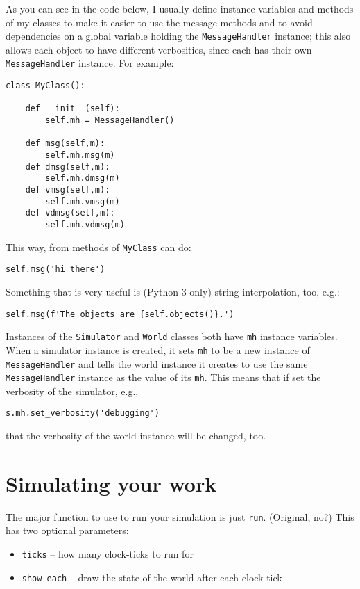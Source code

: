 \documentclass[11pt]{tufte-handout}
\begin{document}
As you can see in the code below, I usually define instance variables and methods of my classes to make it easier to use the message methods and to avoid dependencies on a global variable holding the \texttt{MessageHandler} instance; this also allows each object to have different verbosities, since each has their own \texttt{MessageHandler} instance.  For example:
\begin{verbatim}
class MyClass():
    
    def __init__(self):
        self.mh = MessageHandler()

    def msg(self,m):
        self.mh.msg(m)
    def dmsg(self,m):
        self.mh.dmsg(m)
    def vmsg(self,m):
        self.mh.vmsg(m)
    def vdmsg(self,m):
        self.mh.vdmsg(m)
\end{verbatim}

This way, from methods of \texttt{MyClass} can do:
\begin{verbatim}
self.msg('hi there')
\end{verbatim}


Something that is very useful is (Python 3 only) string interpolation, too, e.g.:
\begin{verbatim}
self.msg(f'The objects are {self.objects()}.')
\end{verbatim}


Instances of the \texttt{Simulator} and \texttt{World} classes both have \texttt{mh} instance variables.  When a simulator instance is created, it sets \texttt{mh} to be a new instance of \texttt{MessageHandler} and tells the world instance it creates to use the same \texttt{MessageHandler} instance as the value of its \texttt{mh}.  This means that if  set the verbosity of  the simulator, e.g.,
\begin{verbatim}
s.mh.set_verbosity('debugging')
\end{verbatim}

\noindent that the verbosity of the world instance will be changed, too.


\section{Simulating your work}
\label{sec:org3573118}

The major function to use to run your simulation is just \texttt{run}.  (Original, no?)  This has two optional parameters:
\begin{itemize}
\item \texttt{ticks} -- how many clock-ticks to run for
\item \texttt{show\_each} -- draw the state of the world after each clock tick
\end{itemize}
\end{document}
